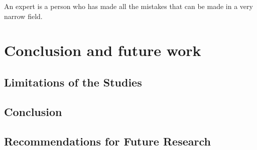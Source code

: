 \begin{savequote}[75mm]
An expert is a person who has made all the mistakes that can be made in a very narrow field.
\end{savequote}
\chapter{Conclusion and future work} \label{chap:conclusion}

\section{Limitations of the Studies}

\section{Conclusion}


\section{Recommendations for Future Research}

